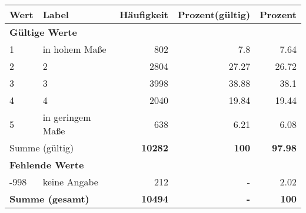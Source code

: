      \begin{longtable}{lXrrr}
     \toprule
     \textbf{Wert} & \textbf{Label} & \textbf{Häufigkeit} & \textbf{Prozent(gültig)} & \textbf{Prozent} \\
     \endhead
     \midrule
     \multicolumn{5}{l}{\textbf{Gültige Werte}}\\

     1 &
     \multicolumn{1}{X}{ in hohem Maße   } &


       \num{802} &
       \num[round-mode=places,round-precision=2]{7,8} &
         \num[round-mode=places,round-precision=2]{7,64} \\

     2 &
     \multicolumn{1}{X}{ 2   } &


       \num{2804} &
       \num[round-mode=places,round-precision=2]{27,27} &
         \num[round-mode=places,round-precision=2]{26,72} \\

     3 &
     \multicolumn{1}{X}{ 3   } &


       \num{3998} &
       \num[round-mode=places,round-precision=2]{38,88} &
         \num[round-mode=places,round-precision=2]{38,1} \\

     4 &
     \multicolumn{1}{X}{ 4   } &


       \num{2040} &
       \num[round-mode=places,round-precision=2]{19,84} &
         \num[round-mode=places,round-precision=2]{19,44} \\

     5 &
     \multicolumn{1}{X}{ in geringem Maße   } &


       \num{638} &
       \num[round-mode=places,round-precision=2]{6,21} &
         \num[round-mode=places,round-precision=2]{6,08} \\
     \midrule
     \multicolumn{2}{l}{Summe (gültig)} &
       \textbf{\num{10282}} &
     \textbf{100} &
       \textbf{\num[round-mode=places,round-precision=2]{97,98}} \\
     \multicolumn{5}{l}{\textbf{Fehlende Werte}}\\
       -998 &
       keine Angabe &
         \num{212} &
        - &
         \num[round-mode=places,round-precision=2]{2,02} \\
     \midrule
     \multicolumn{2}{l}{\textbf{Summe (gesamt)}} &
          \textbf{\num{10494}} &
        \textbf{-} &
        \textbf{100} \\
     \bottomrule
     \end{longtable}
     
